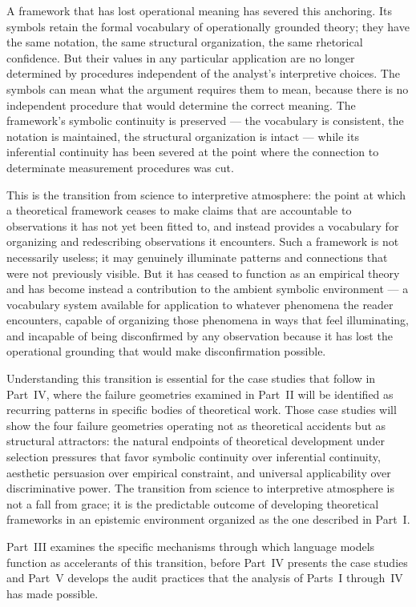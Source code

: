 \documentclass[12pt, openright, twoside]{book}
\begin{document}
A framework that has lost operational meaning has
severed this anchoring. Its symbols retain the formal
vocabulary of operationally grounded theory; they
have the same notation, the same structural organization,
the same rhetorical confidence. But their values in
any particular application are no longer determined
by procedures independent of the analyst's interpretive
choices. The symbols can mean what the argument requires
them to mean, because there is no independent procedure
that would determine the correct meaning. The framework's
symbolic continuity is preserved --- the vocabulary
is consistent, the notation is maintained, the structural
organization is intact --- while its inferential
continuity has been severed at the point where the
connection to determinate measurement procedures was cut.

This is the transition from science to interpretive
atmosphere: the point at which a theoretical framework
ceases to make claims that are accountable to
observations it has not yet been fitted to, and
instead provides a vocabulary for organizing and
redescribing observations it encounters. Such
a framework is not necessarily useless; it may
genuinely illuminate patterns and connections that
were not previously visible. But it has ceased
to function as an empirical theory and has become
instead a contribution to the ambient symbolic
environment --- a vocabulary system available
for application to whatever phenomena the reader
encounters, capable of organizing those phenomena
in ways that feel illuminating, and incapable of
being disconfirmed by any observation because
it has lost the operational grounding that would
make disconfirmation possible.

Understanding this transition is essential for
the case studies that follow in Part~IV, where
the failure geometries examined in Part~II will
be identified as recurring patterns in specific
bodies of theoretical work. Those case studies
will show the four failure geometries operating
not as theoretical accidents but as structural
attractors: the natural endpoints of theoretical
development under selection pressures that favor
symbolic continuity over inferential continuity,
aesthetic persuasion over empirical constraint,
and universal applicability over discriminative
power. The transition from science to interpretive
atmosphere is not a fall from grace; it is the
predictable outcome of developing theoretical
frameworks in an epistemic environment organized
as the one described in Part~I.

Part~III examines the specific mechanisms through
which language models function as accelerants of
this transition, before Part~IV presents the case
studies and Part~V develops the audit practices
that the analysis of Parts~I through~IV has made
possible.
\end{document}
